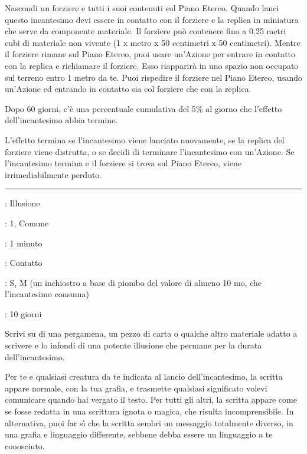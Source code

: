 \begin{multicols}{2}
Nascondi un forziere e tutti i suoi contenuti sul Piano Etereo. Quando lanci questo incantesimo devi essere in contatto con il forziere e la replica in miniatura che serve da componente materiale. Il forziere può contenere fino a 0,25 metri cubi di materiale non vivente (1 x metro x 50 centimetri x 50 centimetri). Mentre il forziere rimane sul Piano Etereo, puoi usare un'Azione per entrare in contatto con la replica e richiamare il forziere. Esso riapparirà in uno spazio non occupato sul terreno entro 1 metro da te. Puoi rispedire il forziere nel Piano Etereo, usando un'Azione ed entrando in contatto sia col forziere che con la replica.

Dopo 60 giorni, c'è una percentuale cumulativa del 5\% al giorno che l'effetto dell'incantesimo abbia termine.

L'effetto termina se l'incantesimo viene lanciato nuovamente, se la replica del forziere viene distrutta, o se decidi di terminare l'incantesimo con un'Azione. Se l'incantesimo termina e il forziere si trova sul Piano Etereo, viene irrimediabilmente perduto.

\smallskip\noindent\rule{\linewidth}{2pt} \hypertarget{Scritto Illusorio}{}\smallskip{}
\noindent
\begin{description}[noitemsep, topsep=0pt, parsep=0pt, partopsep=0pt, leftmargin=0cm, labelwidth=2.8cm]
	\item[\textbf{Lista di Magia}]: Illusione
	\item[\textbf{Livello}]: 1, Comune
	\item[\textbf{T. di Lancio}]: 1 minuto
	\item[\textbf{Gittata}]: Contatto
	\item[\textbf{Componenti}]: S, M (un inchiostro a base di piombo del valore di almeno 10 mo, che l'incantesimo consuma)
	\item[\textbf{Durata}]: 10 giorni
\end{description}

Scrivi su di una pergamena, un pezzo di carta o qualche altro materiale adatto a scrivere e lo infondi di una potente illusione che permane per la durata dell'incantesimo.

Per te e qualsiasi creatura da te indicata al lancio dell'incantesimo, la scritta appare normale, con la tua grafia, e trasmette qualsiasi significato volevi comunicare quando hai vergato il testo. Per tutti gli altri, la scritta appare come se fosse redatta in una scrittura ignota o magica, che risulta incomprensibile. In alternativa, puoi far sì che la scritta sembri un messaggio totalmente diverso, in una grafia e linguaggio differente, sebbene debba essere un linguaggio a te conosciuto.


\end{multicols}
